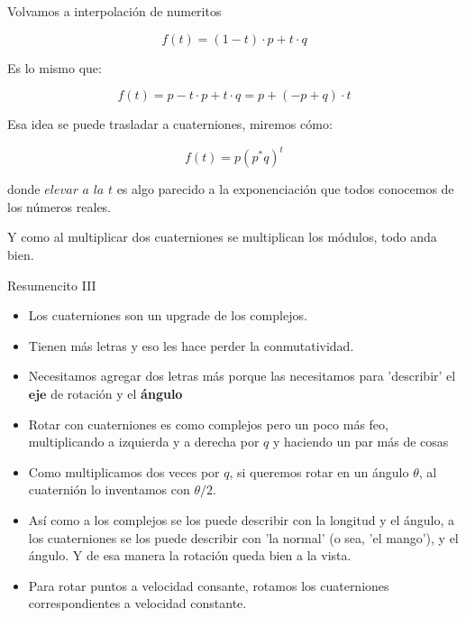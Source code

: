 \documentclass[10pt]{beamer}
\begin{document}
\begin{frame}{Volvamos a interpolación de numeritos}

$$f(t) = (1-t) \cdot p + t \cdot q$$

Es lo mismo que:

$$f(t) = p-t\cdot p + t\cdot q = p + (-p+q) \cdot t$$ 

Esa idea se puede trasladar a cuaterniones, miremos cómo:

$$f(t)= p (p^*q)^t$$ 

donde $\textit{elevar a la $t$}$ es algo parecido a la exponenciación que todos conocemos de los números reales. 

Y como al multiplicar dos cuaterniones se multiplican los módulos, todo anda bien.

\end{frame}

\begin{frame}{Resumencito III}

\begin{itemize}
    \item Los cuaterniones son un upgrade de los complejos.
    \item Tienen más letras y eso les hace perder la conmutatividad.
    \item Necesitamos agregar dos letras más porque las necesitamos para 'describir' el $\textbf{eje}$ de rotación y el \textbf{ángulo}
    \item Rotar con cuaterniones es como complejos pero un poco más feo, multiplicando a izquierda y a derecha por $q$ y haciendo un par más de cosas
    \item Como multiplicamos dos veces por $q$, si queremos rotar en un ángulo $\theta$, al cuaternión lo inventamos con $\theta/2$.
    \item Así como a los complejos se los puede describir con la longitud y el ángulo, a los cuaterniones se los puede describir con 'la normal' (o sea, 'el mango'), y el ángulo. Y de esa manera la rotación queda bien a la vista.
    \item Para rotar puntos a velocidad consante, rotamos los cuaterniones correspondientes a velocidad constante.
    
\end{itemize}
    
\end{frame}
\end{document}
